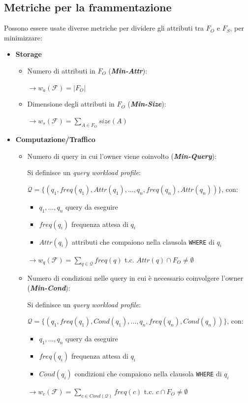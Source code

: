 \documentclass{report}
\begin{document}
\subsection{Metriche per la frammentazione}
Possono essere usate diverse metriche per dividere gli attributi tra $F_O$ e $F_S$, 
per minimizzare:
\begin{itemize}
    \item \textbf{Storage}
    \begin{itemize}
        \item Numero di attributi in $F_O$ (\textit{\textbf{Min-Attr}}):
        
        $\rightarrow w_a(\mathcal{F}) = |F_O|$

        \item Dimensione degli attributi in $F_O$ (\textit{\textbf{Min-Size}}):
        
        $\rightarrow w_s(\mathcal{F}) = \sum_{A \in F_O} size(A)$
    \end{itemize}
    \item \textbf{Computazione/Traffico}
    \begin{itemize}
        \item Numero di query in cui l'owner viene coinvolto (\textit{\textbf{Min-Query}}):
        
        Si definisce un \textit{query workload profile}:

        $\mathcal{Q} = \{(q_1, freq(q_1), Attr(q_1), \dots, q_n, freq(q_n), Attr(q_n)) \}$, con:
        \begin{itemize}
            \item $q_1, \dots, q_n$ query da eseguire 
            \item $freq(q_i)$ frequenza attesa di $q_i$
            \item $Attr(q_i)$ attributi che compaiono nella clausola \texttt{WHERE} di $q_i$
        \end{itemize}

        $\rightarrow w_q(\mathcal{F}) = \sum_{q \in \mathcal{Q}} freq(q)$ t.c. $Attr(q) \cap F_O \neq \emptyset$

        \item Numero di condizioni nelle query in cui è necessario coinvolgere l'owner (\textit{\textbf{Min-Cond}}):
        
        Si definisce un \textit{query workload profile}:

        $\mathcal{Q} = \{(q_1, freq(q_1), Cond(q_1), \dots, q_n, freq(q_n), Cond(q_n)) \}$, con:
        \begin{itemize}
            \item $q_1, \dots, q_n$ query da eseguire 
            \item $freq(q_i)$ frequenza attesa di $q_i$
            \item $Cond(q_i)$ condizioni che compaiono nella clausola \texttt{WHERE} di $q_i$
        \end{itemize}

        $\rightarrow w_c(\mathcal{F}) = \sum_{c \in Cond(\mathcal{Q})} freq(c)$ t.c. $c \cap F_O \neq \emptyset$


    \end{itemize}
\end{itemize}
\end{document}
